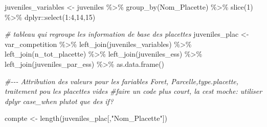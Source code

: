 \documentclass[
  12pt,
  american,
  a4paper,
  extrafontsizes,onecolumn,openright
  ]{memoir}
\newenvironment{Shaded}{\begin{snugshade}}{\end{snugshade}}
\newcommand{\CommentTok}[1]{\textcolor[rgb]{0.56,0.35,0.01}{\textit{#1}}}
\newcommand{\DecValTok}[1]{\textcolor[rgb]{0.00,0.00,0.81}{#1}}
\newcommand{\FunctionTok}[1]{\textcolor[rgb]{0.00,0.00,0.00}{#1}}
\newcommand{\NormalTok}[1]{#1}
\newcommand{\OtherTok}[1]{\textcolor[rgb]{0.56,0.35,0.01}{#1}}
\newcommand{\SpecialCharTok}[1]{\textcolor[rgb]{0.00,0.00,0.00}{#1}}
\newcommand{\StringTok}[1]{\textcolor[rgb]{0.31,0.60,0.02}{#1}}
\begin{document}
\begin{Shaded}
\begin{Highlighting}[]
\NormalTok{juveniles\_variables }\OtherTok{\textless{}{-}}\NormalTok{ juveniles }\SpecialCharTok{\%\textgreater{}\%}
  \FunctionTok{group\_by}\NormalTok{(Nom\_Placette) }\SpecialCharTok{\%\textgreater{}\%}
  \FunctionTok{slice}\NormalTok{(}\DecValTok{1}\NormalTok{) }\SpecialCharTok{\%\textgreater{}\%} 
\NormalTok{  dplyr}\SpecialCharTok{::}\FunctionTok{select}\NormalTok{(}\DecValTok{1}\SpecialCharTok{:}\DecValTok{4}\NormalTok{,}\DecValTok{14}\NormalTok{,}\DecValTok{15}\NormalTok{)}


\CommentTok{\# tableau qui regroupe les information de base des placettes}
\NormalTok{juveniles\_plac }\OtherTok{\textless{}{-}}\NormalTok{ var\_competition }\SpecialCharTok{\%\textgreater{}\%} 
  \FunctionTok{left\_join}\NormalTok{(juveniles\_variables) }\SpecialCharTok{\%\textgreater{}\%}  
  \FunctionTok{left\_join}\NormalTok{(n\_tot\_placette) }\SpecialCharTok{\%\textgreater{}\%}
  \FunctionTok{left\_join}\NormalTok{(juveniles\_ess) }\SpecialCharTok{\%\textgreater{}\%} 
  \FunctionTok{left\_join}\NormalTok{(juveniles\_par\_ess) }\SpecialCharTok{\%\textgreater{}\%} 
  \FunctionTok{as.data.frame}\NormalTok{()}




\CommentTok{\#{-}{-}{-} Attribution des valeurs pour les fariables Foret, Parcelle,type.placette, traitement pou les placettes vides}
\CommentTok{\#faire un code plus court, la c\textquotesingle{}est moche: utiliser dplyr case\_when plutot que des if?}

\NormalTok{compte }\OtherTok{\textless{}{-}} \FunctionTok{length}\NormalTok{(juveniles\_plac[,}\StringTok{"Nom\_Placette"}\NormalTok{])}



\end{Highlighting}
\end{Shaded}
\end{document}
